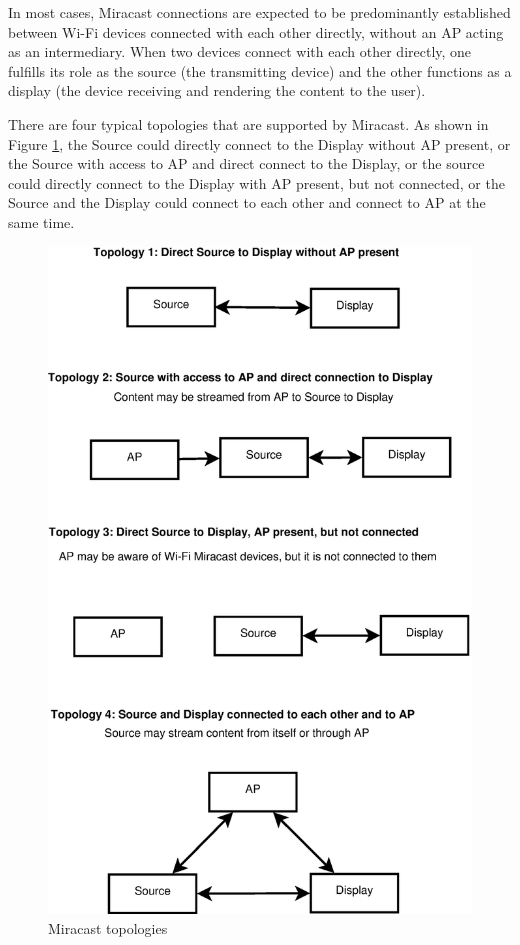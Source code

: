 In most cases, Miracast connections are expected to be predominantly established
between Wi-Fi devices connected with each other directly, without an AP acting
as an intermediary. When two devices connect with each other directly, one fulfills its role as the source (the transmitting device) and the other functions as a display (the device receiving and rendering the content to the user).

There are four typical topologies that are supported by Miracast. As shown in
Figure \ref{miracast_model}, the Source could directly connect to the Display
without AP present, or the Source with access to AP and direct connect to the Display, or the source could directly
connect to the Display with AP present, but not connected, or the Source and
the Display could connect to each other and connect to AP at the same time.

\begin{figure}[htb] \centering 
\hspace*{2cm} \includegraphics[width=0.9\columnwidth]{charts/miracast_model} 
\caption{Miracast topologies \label{miracast_model}} 
\end{figure} 

